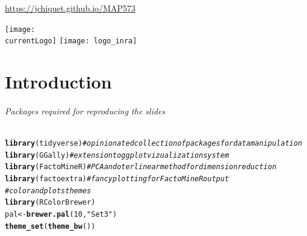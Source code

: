 \documentclass{beamer}\usepackage[]{graphicx}\usepackage[]{color}
\title{\currentCourse}
\subtitle{\huge\currentChapter\normalsize}
\institute{\currentInstitute}
\date{\currentDate}
\makeatletter
\newcommand{\hlnum}[1]{\textcolor[rgb]{0.686,0.059,0.569}{#1}}%
\newcommand{\hlstr}[1]{\textcolor[rgb]{0.192,0.494,0.8}{#1}}%
\newcommand{\hlcom}[1]{\textcolor[rgb]{0.678,0.584,0.686}{\textit{#1}}}%
\newcommand{\hlstd}[1]{\textcolor[rgb]{0.345,0.345,0.345}{#1}}%
\newcommand{\hlkwb}[1]{\textcolor[rgb]{0.69,0.353,0.396}{#1}}%
\newcommand{\hlkwd}[1]{\textcolor[rgb]{0.737,0.353,0.396}{\textbf{#1}}}%
\newenvironment{kframe}{%
 \def\at@end@of@kframe{}%
 \ifinner\ifhmode%
  \def\at@end@of@kframe{\end{minipage}}%
  \begin{minipage}{\columnwidth}%
 \fi\fi%
 \def\FrameCommand##1{\hskip\@totalleftmargin \hskip-\fboxsep
 \colorbox{shadecolor}{##1}\hskip-\fboxsep
     \hskip-\linewidth \hskip-\@totalleftmargin \hskip\columnwidth}%
 \MakeFramed {\advance\hsize-\width
   \@totalleftmargin\z@ \linewidth\hsize
   \@setminipage}}%
 {\par\unskip\endMakeFramed%
 \at@end@of@kframe}
\newenvironment{knitrout}{}{} %
\def\currentLogo{../common_figs/logo_X}
\newcommand{\dotitlepage}{%
  \begin{frame}
    \titlepage
    \vfill
    \begin{center}
        \scriptsize\url{https://jchiquet.github.io/MAP573}
    \end{center}
    \vfill
    \texttt{[image: \\currentLogo]}\hfill
    \texttt{[image: logo\_inra]}
  \end{frame}
}
\makeatother
\begin{document}
\dotitlepage

\part{Introduction}

\begin{frame}[fragile]
  \partpage

\paragraph{Packages required for reproducing the slides}
\begin{knitrout}\scriptsize
{}\color{fgcolor}\begin{kframe}
\begin{alltt}
\hlkwd{library}\hlstd{(tidyverse)}  \hlcom{# opinionated collection of packages for data manipulation}
\hlkwd{library}\hlstd{(GGally)}     \hlcom{# extension to ggplot vizualization system}
\hlkwd{library}\hlstd{(FactoMineR)} \hlcom{# PCA and oter linear method for dimension reduction}
\hlkwd{library}\hlstd{(factoextra)} \hlcom{# fancy plotting for FactoMineR output}
\hlcom{# color and plots themes}
\hlkwd{library}\hlstd{(RColorBrewer)}
\hlstd{pal} \hlkwb{<-} \hlkwd{brewer.pal}\hlstd{(}\hlnum{10}\hlstd{,} \hlstr{"Set3"}\hlstd{)}
\hlkwd{theme_set}\hlstd{(}\hlkwd{theme_bw}\hlstd{())}
\end{alltt}
\end{kframe}
\end{knitrout}

\end{frame}
\end{document}

